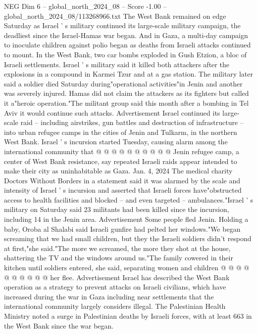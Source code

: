 \begin{textsample}{NEG Dim 6 – global\_north\_2024\_08 – Score -1.00 – global\_north\_2024\_08/113268966.txt}  \label{ex:f6_neg_072}
The West Bank remained on edge Saturday as Israel ' s military continued its large-scale military campaign, the deadliest since the Israel-Hamas war began.
And in Gaza, a multi-day campaign to inoculate children against polio began as deaths from Israeli attacks continued to mount.
In the West Bank, two car bombs exploded in Gush Etzion, a bloc of Israeli settlements.
Israel ' s military said it killed both attackers after the explosions in a compound in Karmei Tzur and at a gas station.
The military later said a soldier died Saturday during"operational activities"in Jenin and another was severely injured.
Hamas did not claim the attackers as its fighters but called it a"heroic operation."The militant group said this month after a bombing in Tel Aviv it would continue such attacks.
Advertisement Israel continued its large-scale raid -- including airstrikes, gun battles and destruction of infrastructure -- into urban refugee camps in the cities of Jenin and Tulkarm, in the northern West Bank.
Israel ' s incursion started Tuesday, causing alarm among the international community that @ @ @ @ @ @ @ @ @ @ Jenin refugee camp, a center of West Bank resistance, say repeated Israeli raids appear intended to make their city as uninhabitable as Gaza.
Jan. 4, 2024 The medical charity Doctors Without Borders in a statement said it was alarmed by the scale and intensity of Israel ' s incursion and asserted that Israeli forces have"obstructed access to health facilities and blocked -- and even targeted -- ambulances."Israel ' s military on Saturday said 23 militants had been killed since the incursion, including 14 in the Jenin area.
Advertisement Some people fled Jenin.
Holding a baby, Oroba al Shalabi said Israeli gunfire had pelted her windows."We began screaming that we had small children, but they the Israeli soldiers didn't respond at first,"she said."The more we screamed, the more they shot at the house, shattering the TV and the windows around us."The family cowered in their kitchen until soldiers entered, she said, separating women and children @ @ @ @ @ @ @ @ @ @ her flee.
Advertisement Israel has described the West Bank operation as a strategy to prevent attacks on Israeli civilians, which have increased during the war in Gaza including near settlements that the international community largely considers illegal.
The Palestinian Health Ministry noted a surge in Palestinian deaths by Israeli forces, with at least 663 in the West Bank since the war began.

\end{textsample}
